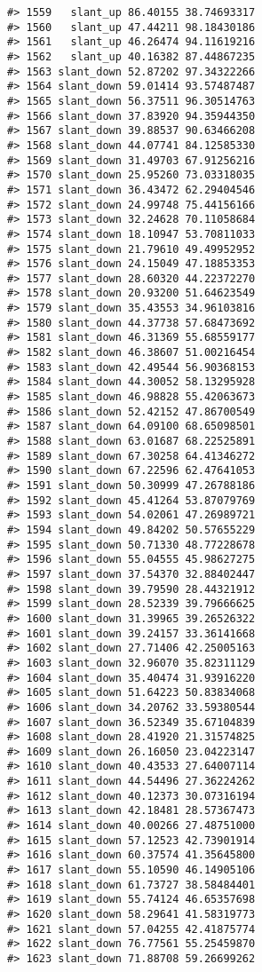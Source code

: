 \documentclass[
]{book}
\theoremstyle{definition}
\theoremstyle{definition}
\theoremstyle{definition}
\theoremstyle{definition}
\theoremstyle{remark}
\begin{document}
\begin{verbatim}
#> 1559   slant_up 86.40155 38.74693317
#> 1560   slant_up 47.44211 98.18430186
#> 1561   slant_up 46.26474 94.11619216
#> 1562   slant_up 40.16382 87.44867235
#> 1563 slant_down 52.87202 97.34322266
#> 1564 slant_down 59.01414 93.57487487
#> 1565 slant_down 56.37511 96.30514763
#> 1566 slant_down 37.83920 94.35944350
#> 1567 slant_down 39.88537 90.63466208
#> 1568 slant_down 44.07741 84.12585330
#> 1569 slant_down 31.49703 67.91256216
#> 1570 slant_down 25.95260 73.03318035
#> 1571 slant_down 36.43472 62.29404546
#> 1572 slant_down 24.99748 75.44156166
#> 1573 slant_down 32.24628 70.11058684
#> 1574 slant_down 18.10947 53.70811033
#> 1575 slant_down 21.79610 49.49952952
#> 1576 slant_down 24.15049 47.18853353
#> 1577 slant_down 28.60320 44.22372270
#> 1578 slant_down 20.93200 51.64623549
#> 1579 slant_down 35.43553 34.96103816
#> 1580 slant_down 44.37738 57.68473692
#> 1581 slant_down 46.31369 55.68559177
#> 1582 slant_down 46.38607 51.00216454
#> 1583 slant_down 42.49544 56.90368153
#> 1584 slant_down 44.30052 58.13295928
#> 1585 slant_down 46.98828 55.42063673
#> 1586 slant_down 52.42152 47.86700549
#> 1587 slant_down 64.09100 68.65098501
#> 1588 slant_down 63.01687 68.22525891
#> 1589 slant_down 67.30258 64.41346272
#> 1590 slant_down 67.22596 62.47641053
#> 1591 slant_down 50.30999 47.26788186
#> 1592 slant_down 45.41264 53.87079769
#> 1593 slant_down 54.02061 47.26989721
#> 1594 slant_down 49.84202 50.57655229
#> 1595 slant_down 50.71330 48.77228678
#> 1596 slant_down 55.04555 45.98627275
#> 1597 slant_down 37.54370 32.88402447
#> 1598 slant_down 39.79590 28.44321912
#> 1599 slant_down 28.52339 39.79666625
#> 1600 slant_down 31.39965 39.26526322
#> 1601 slant_down 39.24157 33.36141668
#> 1602 slant_down 27.71406 42.25005163
#> 1603 slant_down 32.96070 35.82311129
#> 1604 slant_down 35.40474 31.93916220
#> 1605 slant_down 51.64223 50.83834068
#> 1606 slant_down 34.20762 33.59380544
#> 1607 slant_down 36.52349 35.67104839
#> 1608 slant_down 28.41920 21.31574825
#> 1609 slant_down 26.16050 23.04223147
#> 1610 slant_down 40.43533 27.64007114
#> 1611 slant_down 44.54496 27.36224262
#> 1612 slant_down 40.12373 30.07316194
#> 1613 slant_down 42.18481 28.57367473
#> 1614 slant_down 40.00266 27.48751000
#> 1615 slant_down 57.12523 42.73901914
#> 1616 slant_down 60.37574 41.35645800
#> 1617 slant_down 55.10590 46.14905106
#> 1618 slant_down 61.73727 38.58484401
#> 1619 slant_down 55.74124 46.65357698
#> 1620 slant_down 58.29641 41.58319773
#> 1621 slant_down 57.04255 42.41875774
#> 1622 slant_down 76.77561 55.25459870
#> 1623 slant_down 71.88708 59.26699262

\end{verbatim}
\end{document}
